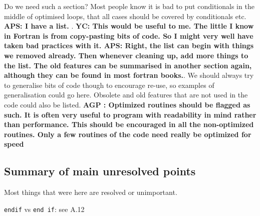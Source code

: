 \documentclass[12pt,twoside,notitlepage,a4paper]{article}
\newcommand{\code}[1]{\texttt{#1}}
\begin{document}
Do we need such a section? Most people know it is bad to put conditionals in the middle of 
optimised loops, that all cases should be covered by conditionals etc. {\bf APS: I have a list.
}. \textbf{YC: This would be useful to me. The little I know in Fortran is from copy-pasting bits of code. So I might very well have taken bad practices with it.
APS: Right, the list can begin with things we removed already.
Then whenever cleaning up, add more things to the list.
The old features can be summarised in another section again, although they can be found in most fortran books.}. We should always try to generalise bits of code though to encourage re-use, so
examples of generalisation could go here. Obsolete and old features that are not used in the code
could also be listed.
{\bf AGP : Optimized routines should be flagged as such. It is often very useful to program 
with readability in mind rather than performance. This should be encouraged in all the 
non-optimized routines. Only a few routines of the code need really be optimized for speed}

\subsection{Summary of main unresolved points}

\begin{description}
 \item Most things that were here are resolved or unimportant.
  \item \code{endif} vs \code{end if}: see A.12
\end{description}




\end{document}
